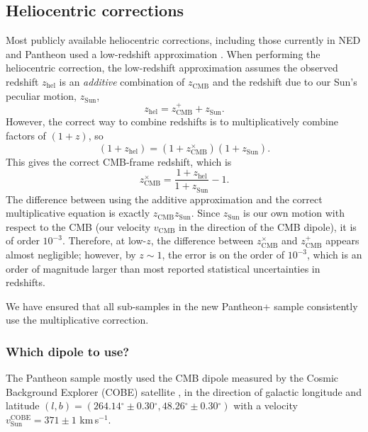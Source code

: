 \documentclass[
  journal=pasa,
  manuscript=research-paper,
  year=2022,
]{cup-journal}
\newcommand{\zCMB}[1]{\ensuremath{z_{\text{CMB}}^{\mathrm{#1}}}}
\newcommand{\zSun}[1]{\ensuremath{z_{\text{Sun}}^{\mathrm{#1}}}}
\newcommand\zhel{\ensuremath{z_{\text{hel}}}}
\newcommand\dg{\ensuremath{^{\circ}}}
\newcommand\voC{\ensuremath{v_{\text{Sun}}^{\text{COBE}}}}
\newcommand{\ten}[1]{\ensuremath{10^{#1}}}
\newcommand{\kms}{km\,s$^{-1}$}
\begin{document}
\subsection{Heliocentric corrections}
Most publicly available heliocentric corrections, including those currently in NED and Pantheon used a low-redshift approximation \citep[although the approximation in NED will be corrected; see][]{Carr2021}.
When performing the heliocentric correction, the low-redshift approximation assumes the observed redshift \zhel{} is an {\em additive} combination of \zCMB{} and the redshift due to our Sun's peculiar motion, \zSun{},
\begin{equation} \label{eq:additive} 
\zhel{}=\zCMB{+}+\zSun{}.
\end{equation}
However, the correct way to combine redshifts is to multiplicatively combine factors of $(1+z)$, so
\begin{equation} \label{eq:multiplicative} 
(1+\zhel)=(1+\zCMB{\times})(1+\zSun{}). 
\end{equation}
This gives the correct CMB-frame redshift, which is
\begin{equation} \label{eq:full_correction} 
\zCMB{\times} = \frac{1+\zhel{}}{1+\zSun{}}-1. 
\end{equation}
The difference between using the additive approximation and the correct multiplicative equation is exactly \zCMB{}\zSun{}.
Since \zSun{} is our own motion with respect to the CMB (our velocity $v_{\text{CMB}}$ in the direction of the CMB dipole), it is of order $\ten{-3}$. 
Therefore, at low-$z$, the difference between \zCMB{\times} and \zCMB{+} appears almost negligible; however, by $z\sim 1$, the error is on the order of \ten{-3}, which is an order of magnitude larger than most reported statistical uncertainties in redshifts.

We have ensured that all sub-samples in the new Pantheon+ sample consistently use the multiplicative correction.

\subsubsection{Which dipole to use?} \label{subsec:dipole}

The Pantheon sample mostly used the CMB dipole measured by the Cosmic Background Explorer (COBE) satellite \citep{Fixsen1996}, in the direction of galactic longitude and latitude $(l, b) = (264.14\dg{}\pm0.30\dg{}, 48.26\dg{}\pm0.30\dg{})$ with a velocity $\voC = 371\pm1$ \kms{}.
\end{document}
